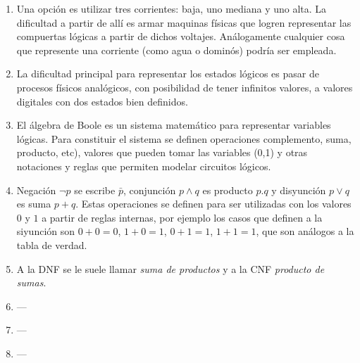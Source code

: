 \documentclass[a4paper]{article}
\begin{document}
\begin{enumerate}
\begin{enumerate} [label=(\alph*)]
		\item Una opción es utilizar tres corrientes: baja, uno mediana y uno alta. La dificultad a partir de allí es armar maquinas físicas que logren representar las compuertas lógicas a partir de dichos voltajes. Análogamente cualquier cosa que represente una corriente (como agua o dominós) podría ser empleada. 
		\item La dificultad principal para representar los estados lógicos es pasar de procesos físicos analógicos, con posibilidad de tener infinitos valores, a valores digitales con dos estados bien definidos. 
		\item El álgebra de Boole es un sistema matemático para representar variables lógicas. Para constituir el sistema se definen operaciones complemento, suma, producto, etc), valores que pueden tomar las variables (0,1) y otras notaciones y reglas que permiten modelar circuitos lógicos.
		\item Negación $\neg p$ se escribe $\bar{p}$, conjunción $p\land q$ es producto $p.q$ y disyunción $p \lor q$ es suma $p+q$. Estas operaciones se definen para ser utilizadas con los valores $0$ y $1$ a partir de reglas internas, por ejemplo los casos que definen a la siyunción son $0+0=0$, $1+0=1$, $0+1=1$, $1+1=1$, que son análogos a la tabla de verdad.
		\item A la DNF se le suele llamar \textit{suma de productos} y a la CNF \textit{producto de sumas}.
\item ---\item ---\item ---\end{enumerate}\end{enumerate}
\end{document}
